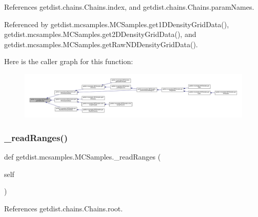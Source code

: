 References getdist.\+chains.\+Chains.\+index, and getdist.\+chains.\+Chains.\+param\+Names.



Referenced by getdist.\+mcsamples.\+M\+C\+Samples.\+get1\+D\+Density\+Grid\+Data(), getdist.\+mcsamples.\+M\+C\+Samples.\+get2\+D\+Density\+Grid\+Data(), and getdist.\+mcsamples.\+M\+C\+Samples.\+get\+Raw\+N\+D\+Density\+Grid\+Data().

Here is the caller graph for this function\+:
\nopagebreak
\begin{figure}[H]
\begin{center}
\leavevmode
\includegraphics[width=350pt]{classgetdist_1_1mcsamples_1_1MCSamples_a6ffc3541b4b059fe621867360b2701fd_icgraph}
\end{center}
\end{figure}
\mbox{\label{classgetdist_1_1mcsamples_1_1MCSamples_ac8219d67eb4ca850a314227ff04575d2}} 
\subsubsection{\texorpdfstring{\+\_\+read\+Ranges()}{\_readRanges()}}
{\footnotesize\ttfamily def getdist.\+mcsamples.\+M\+C\+Samples.\+\_\+read\+Ranges (\begin{DoxyParamCaption}\item[{}]{self }\end{DoxyParamCaption})\hspace{0.3cm}{\ttfamily [private]}}



References getdist.\+chains.\+Chains.\+root.

\mbox{\label{classgetdist_1_1mcsamples_1_1MCSamples_a6cbc5f8ec4356d9ef56c6858a88d9ed6}} 
